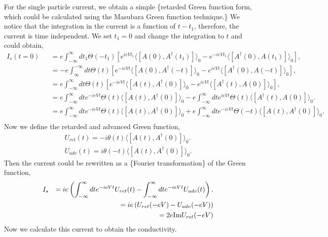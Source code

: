 \documentclass[11pt]{article}
\begin{document}
For the single particle current, we obtain a simple \{\pb retarded Green
function form, which could be calculated using the Masubara Green
function technique.\} We notice that the integration in the current is a
function of \(t-t_1\), therefore, the current is time independent. We
set \(t_1 = 0\) and change the integration to \(t\) and could obtain,
\begin{eqnarray}
I_s(t=0) &&=e \int_{-\infty}^{\infty} dt_1 \Theta(-t_1)
\left[e^{ieVt_1} \langle  [A(0),A^{\dagger}(t_1)] \rangle_0 -e^{-ieV t_1} \langle  [A^{\dagger}(0),A(t_1)] \rangle_0 
\right],
\nonumber\\
&& = - e \int_{\infty}^{-\infty} dt \Theta(t)
\left[e^{-ieVt} \langle  [A(0),A^{\dagger}(-t)] \rangle_0 -e^{ieV t} \langle  [A^{\dagger}(0),A(-t)] \rangle_0  
\right],
\nonumber\\
&& = e \int_{-\infty}^{\infty} dt \Theta(t)
\left[e^{-ieVt} \langle  [A(t),A^{\dagger}(0)] \rangle_0 -e^{ieV t} \langle  [A^{\dagger}(t),A(0)] \rangle_0  
\right],
\nonumber\\
&& =e 
\int_{-\infty}^{\infty} dt e^{-ieVt}   \Theta(t) \langle  [A(t),A^{\dagger}(0)] \rangle_0 -e \int_{-\infty}^{\infty} dt e^{ieV t}   \Theta(t) \langle  [A^{\dagger}(t),A(0)] \rangle_0.
\nonumber\\
&&=  e 
\int_{-\infty}^{\infty} dt e^{-ieVt}   \Theta(t) \langle  [A(t),A^{\dagger}(0)] \rangle_0 +e \int_{-\infty}^{\infty} dt e^{-ieV t}   \Theta(-t) \langle  [A(t),A^\dagger(0)] \rangle_0.
\nonumber\\
\end{eqnarray} Now we define the retarded and advanced Green function,
\begin{eqnarray}
U_{ret}(t)=-i \theta(t)  \langle  [A(t),A^\dagger(0)] \rangle_0. 
\nonumber\\
U_{adv}(t)= i \theta(-t)  \langle  [A(t),A^\dagger(0)] \rangle_0. 
\end{eqnarray} Then the current could be rewritten as a \{\pb Fourier
transformation\} of the Green function,\\
\begin{eqnarray}
I_s &&=i e 
\left( \int_{-\infty}^{\infty} dt e^{-ieVt}  U_{ret}(t) -  \int_{-\infty}^{\infty} dt e^{-ieV t}    U_{adv}(t) \right).
\nonumber\\ \nonumber
&&= ie \left( U_{ret} (-eV) - U_{adv} (-eV) \right)
\\ 
&&= 2e {\rm Im} U_{ret} (-eV)
\end{eqnarray} Now we calculate this current to obtain the conductivity.
\end{document}
